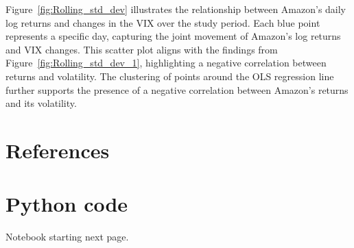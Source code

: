 \documentclass{article}
\begin{document}
\noindent Figure~\ref{fig:Rolling_std_dev} illustrates the relationship between Amazon's daily log returns and changes in the VIX over the study period. Each blue point represents a specific day, capturing the joint movement of Amazon’s log returns and VIX changes. This scatter plot aligns with the findings from Figure~\ref{fig:Rolling_std_dev_1}, highlighting a negative correlation between returns and volatility. The clustering of points around the OLS regression line further supports the presence of a negative correlation between Amazon’s returns and its volatility.


\appendix
\section{References}



\section{Python code}
Notebook starting next page.

%
\end{document}
